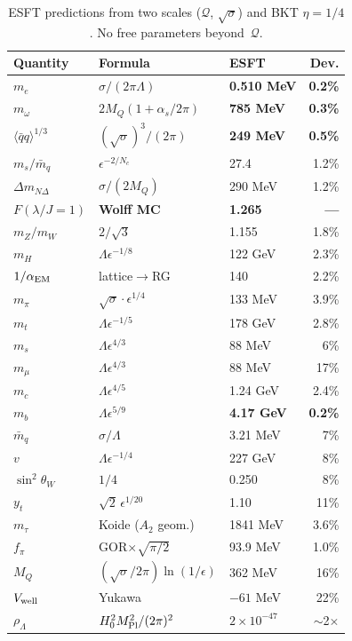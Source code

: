 ﻿\documentclass[aps,prl,twocolumn,superscriptaddress,showpacs]{revtex4-2}
\newcommand{\Qoppa}{\mathcal{Q}} %
\begin{document}
\begin{table}[t]
\caption{ESFT predictions from two scales ($\Qoppa$, $\sqrt{\sigma}$)
and BKT $\eta=1/4$. No free parameters beyond~$\Qoppa$.}
\label{tab:predictions}
\begin{ruledtabular}
\begin{tabular}{lllr}
Quantity & Formula & ESFT & Dev.\\
\hline
\textbf{$m_e$} & \textbf{$\sigma/(2\pi\Lambda)$} & \textbf{0.510 MeV} & \textbf{0.2\%}\\
\textbf{$m_\omega$} & \textbf{$2M_Q(1\!+\!\alpha_s/2\pi)$} & \textbf{785 MeV} & \textbf{0.3\%}\\
\textbf{$\langle\bar qq\rangle^{1/3}$} & \textbf{$(\sqrt\sigma)^3/(2\pi)$} & \textbf{249 MeV} & \textbf{0.5\%}\\
$m_s/\bar m_q$ & $\epsilon^{-2/N_c}$ & 27.4 & 1.2\%\\
$\Delta m_{N\Delta}$ & $\sigma/(2M_Q)$ & 290 MeV & 1.2\%\\
\textbf{$F(\lambda/J\!=\!1)$} & \textbf{Wolff MC} & \textbf{1.265} & \textbf{---}\\
\hline
$m_Z/m_W$ & $2/\sqrt3$ & 1.155 & 1.8\%\\
$m_H$ & $\Lambda\epsilon^{-1/8}$ & 122 GeV & 2.3\%\\
$1/\alpha_{\rm EM}$ & lattice$\to$RG & 140 & 2.2\%\\
$m_\pi$ & $\sqrt\sigma\cdot\epsilon^{1/4}$ & 133 MeV & 3.9\%\\
$m_t$ & $\Lambda\epsilon^{-1/5}$ & 178 GeV & 2.8\%\\
\hline
$m_s$ & $\Lambda\epsilon^{4/3}$ & 88 MeV & 6\%\\
$m_\mu$ & $\Lambda\epsilon^{4/3}$ & 88 MeV & 17\%\\
$m_c$ & $\Lambda\epsilon^{4/5}$ & 1.24 GeV & 2.4\%\\
\textbf{$m_b$} & \textbf{$\Lambda\epsilon^{5/9}$} & \textbf{4.17 GeV} & \textbf{0.2\%}\\
$\bar m_q$ & $\sigma/\Lambda$ & 3.21 MeV & 7\%\\
$v$ & $\Lambda\epsilon^{-1/4}$ & 227 GeV & 8\%\\
$\sin^2\!\theta_W$ & $1/4$ & 0.250 & 8\%\\
$y_t$ & $\sqrt2\,\epsilon^{1/20}$ & 1.10 & 11\%\\
$m_\tau$ & Koide ($A_2$ geom.) & 1841 MeV & 3.6\%\\
$f_\pi$ & GOR$\times\!\sqrt{\pi/2}$ & 93.9 MeV & 1.0\%\\
$M_Q$ & $(\sqrt\sigma/2\pi)\ln(1/\epsilon)$ & 362 MeV & 16\%\\
$V_{\rm well}$ & Yukawa & $-61$ MeV & 22\%\\
$\rho_\Lambda$ & $H_0^2M_{\rm Pl}^2/(2\pi)^2$ & $2\!\times\!10^{-47}$ & $\sim$2$\times$\\
\end{tabular}
\end{ruledtabular}
\end{table}
\end{document}
